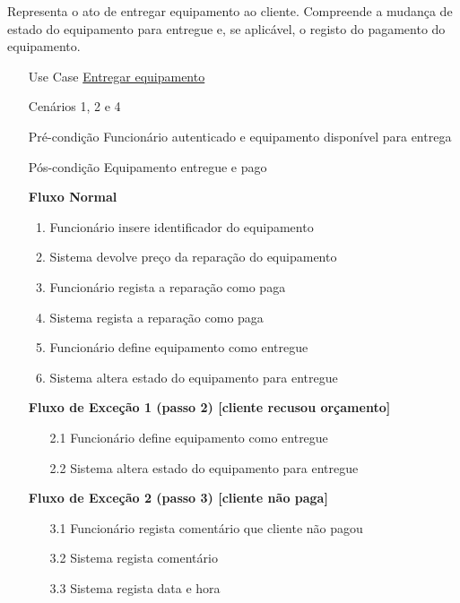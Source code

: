 \documentclass[../relatorio.tex]{subfiles}
\begin{document}
Representa o ato de entregar equipamento ao cliente.
Compreende a mudança de estado do equipamento para entregue
e, se aplicável, o registo do pagamento do equipamento.
\begin{itemize}
    \item[Use Case] {\underline{Entregar equipamento}}
    \item[Cenários] {1, 2 e 4}
    \item[Pré-condição] {Funcionário autenticado e equipamento disponível para entrega}
    \item[Pós-condição] {Equipamento entregue e pago}
          \begin{flushleft}
              \textbf{Fluxo Normal}
          \end{flushleft}
          \begin{enumerate}
              \item Funcionário insere identificador do equipamento
              \item Sistema devolve preço da reparação do equipamento
              \item Funcionário regista a reparação como paga
              \item Sistema regista a reparação como paga
              \item Funcionário define equipamento como entregue
              \item Sistema altera estado do equipamento para entregue
          \end{enumerate}
          \begin{flushleft}
              \textbf{Fluxo de Exceção 1 (passo 2) [cliente recusou orçamento]}
          \end{flushleft}
          \begin{itemize}
              \item[2.1] Funcionário define equipamento como entregue
              \item[2.2] Sistema altera estado do equipamento para entregue
          \end{itemize}
             \begin{flushleft}
                 \textbf{Fluxo de Exceção 2 (passo 3) [cliente não paga]}
             \end{flushleft}
             \begin{itemize}
                 \item[3.1]{Funcionário regista comentário que cliente não pagou}
                 \item[3.2]{Sistema regista comentário}
                 \item[3.3]{Sistema regista data e hora}  
             \end{itemize}
\end{itemize}
\end{document}
